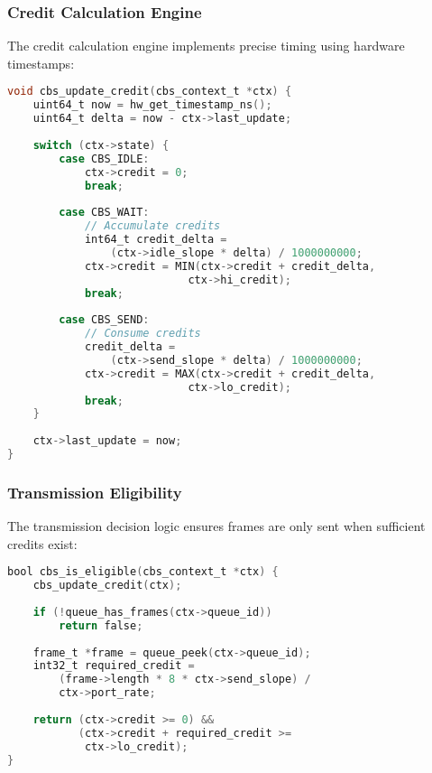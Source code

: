 \documentclass[10pt, journal, compsoc]{IEEEtran}
\begin{document}
\subsubsection{Credit Calculation Engine}

The credit calculation engine implements precise timing using hardware timestamps:

\begin{lstlisting}[language=C, caption=Credit Update Algorithm]
void cbs_update_credit(cbs_context_t *ctx) {
    uint64_t now = hw_get_timestamp_ns();
    uint64_t delta = now - ctx->last_update;
    
    switch (ctx->state) {
        case CBS_IDLE:
            ctx->credit = 0;
            break;
            
        case CBS_WAIT:
            // Accumulate credits
            int64_t credit_delta = 
                (ctx->idle_slope * delta) / 1000000000;
            ctx->credit = MIN(ctx->credit + credit_delta, 
                            ctx->hi_credit);
            break;
            
        case CBS_SEND:
            // Consume credits
            credit_delta = 
                (ctx->send_slope * delta) / 1000000000;
            ctx->credit = MAX(ctx->credit + credit_delta, 
                            ctx->lo_credit);
            break;
    }
    
    ctx->last_update = now;
}
\end{lstlisting}

\subsubsection{Transmission Eligibility}

The transmission decision logic ensures frames are only sent when sufficient credits exist:

\begin{lstlisting}[language=C, caption=Transmission Eligibility Check]
bool cbs_is_eligible(cbs_context_t *ctx) {
    cbs_update_credit(ctx);
    
    if (!queue_has_frames(ctx->queue_id))
        return false;
        
    frame_t *frame = queue_peek(ctx->queue_id);
    int32_t required_credit = 
        (frame->length * 8 * ctx->send_slope) / 
        ctx->port_rate;
    
    return (ctx->credit >= 0) && 
           (ctx->credit + required_credit >= 
            ctx->lo_credit);
}
\end{lstlisting}
\end{document}
